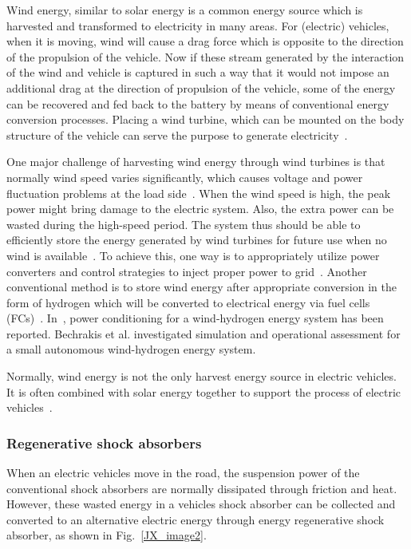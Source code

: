 Wind energy, similar to solar energy is a common energy source which is harvested and transformed to electricity in many areas. For (electric) vehicles, when it is moving, wind will cause a drag force which is opposite to the direction of the propulsion of the vehicle. Now if these stream generated by the interaction of the wind and vehicle is captured in such a way that it would not impose an additional drag at the direction of propulsion of the vehicle, some of the energy can be recovered and fed back to the battery by means of conventional energy conversion processes. Placing a wind turbine, which can be mounted on the body structure of the vehicle can serve the purpose to generate electricity~\cite{JX_13,JX_50}.

One major challenge of harvesting wind energy through wind turbines is that normally wind speed varies significantly, which causes voltage and power fluctuation problems at the load side~\cite{JX_73}. When the wind speed is high, the peak power might bring damage to the electric system. Also, the extra power can be wasted during the high-speed period. The system thus should be able to efficiently store the energy generated by wind turbines for future use when no wind is available~\cite{JX_32}. To achieve this, one way is to appropriately utilize power converters and control strategies to inject proper power to grid~\cite{JX_15,JX_51,JX_52}. Another conventional method is to store wind energy after appropriate conversion in the form of hydrogen which will be converted to electrical energy via fuel cells (FCs)~\cite{JX_53}. In~\cite{JX_8}, power conditioning for a wind-hydrogen energy system has been reported. Bechrakis et al. \cite{JX_9} investigated simulation and operational assessment for a small autonomous wind-hydrogen energy system.

Normally, wind energy is not the only harvest energy source in electric vehicles. It is often combined with solar energy together to support the process of electric vehicles~\cite{JX_13,JX_52,JX_62}.

\subsubsection{Regenerative shock absorbers}

When an electric vehicles move in the road, the suspension power of the conventional shock absorbers are normally dissipated through friction and heat. However, these wasted energy in a vehicles shock absorber can be collected and converted to an alternative electric energy through energy regenerative shock absorber, as shown in Fig.~\ref{JX_image2}.

